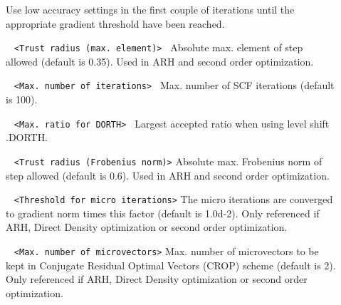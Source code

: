 \begin{description}
\item[] Use low accuracy settings in the first couple of 
iterations until the appropriate gradient threshold have been reached. 

\item[] \verb| | \newline
\verb|<Trust radius (max. element)> |\newline
Absolute max. element of step allowed (default is 0.35).
Used in ARH and second order optimization.
\item[] \verb| | \newline
\verb|<Max. number of iterations> |\newline
Max. number of SCF iterations (default is 100).
\item[] \verb| | \newline
\verb|<Max. ratio for DORTH> |\newline
Largest accepted ratio when using level shift .DORTH.
\item[] \verb| | \newline
\verb|<Trust radius (Frobenius norm)>|\newline
Absolute max. Frobenius norm of step allowed (default is 0.6).
Used in ARH and second order optimization.
\item[] \verb| | \newline
\verb|<Threshold for micro iterations>|\newline
The micro iterations are converged to gradient norm times this factor (default is 1.0d-2).
Only referenced if ARH, Direct Density optimization or second order optimization.
\item[] \verb| | \newline
\verb|<Max. number of microvectors>|\newline
Max. number of microvectors to be kept in Conjugate Residual Optimal Vectors (CROP) scheme
(default is 2). 
Only referenced if ARH, Direct Density optimization or second order optimization.
\item[] \verb| | \newline

\end{description}
